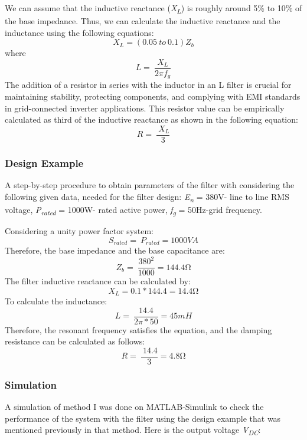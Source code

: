 \documentclass[12pt,a4paper]{book}
\begin{document}
We can assume that the inductive reactance (\emph{X\textsubscript{L}}) is roughly around 5\% to 10\% of the base impedance. Thus, we can calculate the inductive reactance and the inductance using the following equations:
\begin{equation}
  X_{L} = (0.05\ to\ 0.1)Z_{b}
  \label{equation:eq13}
\end{equation}
where
\begin{equation}
  L = \ \frac{X_{L}}{2\pi f_{g}}
  \label{equation:eq14}
\end{equation}
The addition of a resistor in series with the inductor in an L filter is crucial for maintaining stability, protecting components, and complying with EMI standards in grid-connected inverter applications. This resistor value can be empirically calculated as third of the inductive reactance as shown in the following equation:
\begin{equation}
  R = \ \frac{\ X_{L}}{3}
  \label{equation:eq15}
\end{equation}

\subsubsection{Design Example}
A step-by-step procedure to obtain parameters of the filter with considering the following given data, needed for the filter design: \emph{E\textsubscript{n}} = 380V- line to line RMS voltage, \emph{P\textsubscript{rated}} = 1000W- rated active power, \emph{f\textsubscript{g}} = 50Hz-grid frequency. 

Considering a unity power factor system:
\[S_{rated} = \ P_{rated} = 1000VA\]
Therefore, the base impedance and the base capacitance are:
\[Z_{b} = \ \frac{380^{2}}{1000} = 144.4\mathrm{\Omega}\]
The filter inductive reactance can be calculated by:
\[X_{L} = 0.1*144.4 = 14.4\mathrm{\Omega}\]
To calculate the inductance:
\[L = \ \frac{14.4}{2\pi*50} = 45mH\]
Therefore, the resonant frequency satisfies the equation, and the damping resistance can be calculated as follows:
\[R = \ \frac{\ 14.4}{3} = 4.8\mathrm{\Omega}\]

\subsubsection{Simulation}
A simulation of method I was done on MATLAB-Simulink to check the performance of the system with the filter using the design example that was mentioned previously in that method. Here is the output voltage \emph{V\textsubscript{DC}}:
\end{document}
